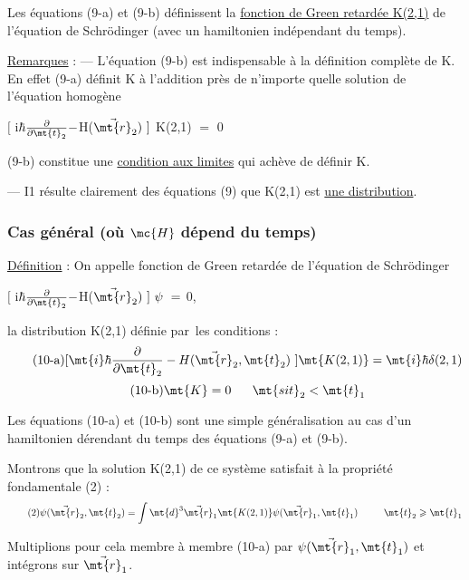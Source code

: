 Les équations (9-a) et (9-b) définissent la \ul{fonction de Green retardée
K(2,1)} de l'équation de Schrödinger (avec un hamiltonien indépendant
du temps).

\ul{Remarques} :
— L'équation (9-b) est indispensable à la définition complète de K. En
effet (9-a) définit K à l'addition près de n'importe quelle solution de
l'équation homogène
\begin{center}
$[$ i$\hbar\frac{\partial}{\partial\mt{t}_2}-$H($\vec{\mt{r}}_2)\ ]$ K(2,1) $=$ 0
\end{center}

(9-b) constitue une \ul{condition aux limites} qui achève de définir K.

— I1 résulte clairement des équations (9) que K(2,1) est \ul{une distribution}.

\subsubsection{Cas général (où $\mc{H}$ dépend du temps)}%
\ul{Définition} : On appelle fonction de Green retardée de l'équation de
Schrödinger
\begin{center}
$[$ i$\hbar\frac{\partial}{\partial\mt{t}_2}-$H($\vec{\mt{r}}_2)\ ]\ \psi\ =$ 0,
\end{center}
la distribution K(2,1) définie par les
conditions :
\[
\tag{10-a}[\mt{ i}\hbar\frac{\partial}{\partial\mt{t}_2}-H(\vec{\mt{r}}_2,\mt{ t}_2)\ ]\mt{ K(2,1) }=
\mt{i}\hbar\delta(2,1)
\]
\[
\tag{10-b}\mt{K}=0\ \ \ \ \ \mt{si t}_2<\mt{t}_1
\]

Les équations (10-a) et (10-b) sont une simple généralisation
au cas d'un hamiltonien dérendant du temps des équations (9-a) et (9-b).

Montrons que la solution K(2,1) de ce système satisfait à la
propriété fondamentale (2) :
\[
\tag{2}\psi(\vec{\mt{r}}_2,\mt{t}_2)=\int\mt{d}^3\vec{\mt{r}}_1\mt{ K(2,1) }\psi(\vec{\mt{r}}_1,\mt{t}_1)
\ \ \ \ \ \ \ \ \mt{t}_2\geqslant\mt{t}_1
\]

Multiplions pour cela membre à membre (10-a) par $\psi(\vec{\mt{r}}_1,\mt{t}_1)$ et intégrons
sur $\vec{\mt{r}}_1$.

